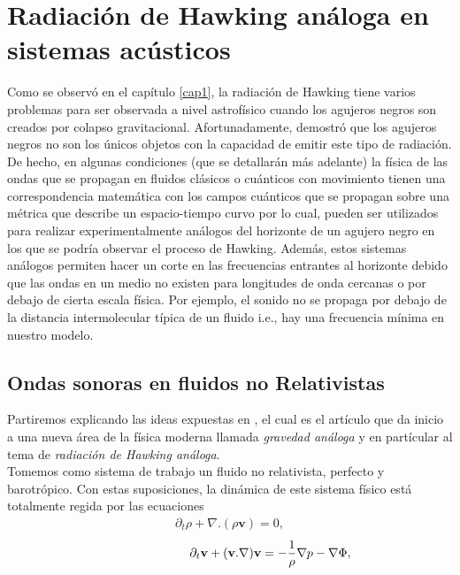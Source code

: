 \chapter{Radiaci\'{o}n de Hawking an\'{a}loga en sistemas ac\'{u}sticos}\label{cap2}
Como se observ\'{o} en el cap\'{i}tulo \ref{cap1}, la radiaci\'{o}n de Hawking tiene varios problemas para ser observada a nivel astrof\'{i}sico cuando los agujeros negros son creados por colapso gravitacional. Afortunadamente, \cite{Unruh1981} demostró que los agujeros negros no son los únicos objetos con la capacidad de emitir este tipo de radiaci\'{o}n. De hecho, en algunas condiciones (que se detallar\'{a}n más adelante) la física de las ondas que se propagan en fluidos cl\'{a}sicos o cu\'{a}nticos con movimiento tienen una correspondencia matemática con los campos cu\'{a}nticos que se propagan sobre una m\'{e}trica que describe un espacio-tiempo curvo por lo cual, pueden ser utilizados para realizar experimentalmente análogos del horizonte de un agujero negro en los que se podría observar el proceso de Hawking. Además, estos sistemas an\'{a}logos permiten hacer un corte en las frecuencias entrantes al horizonte debido que las ondas en un medio no existen para longitudes de onda cercanas o por debajo de cierta escala física. Por ejemplo, el sonido no se propaga por debajo de la distancia intermolecular típica de un fluido i.e., hay una frecuencia m\'{i}nima en nuestro modelo.

\section{Ondas sonoras en fluidos no Relativistas}
Partiremos explicando las ideas expuestas en  \citep{Unruh1981}, el cual es el art\'{i}culo  que da inicio a una nueva \'{a}rea de la f\'{i}sica moderna llamada \textit{gravedad an\'{a}loga} \citep{barcelo2011analogue} y en part\'{i}cular al tema de \textit{radiaci\'{o}n de Hawking  an\'{a}loga}.\\

Tomemos como sistema de trabajo un fluido no relativista, perfecto y barotr\'{o}pico. Con estas suposiciones, la din\'{a}mica de este sistema f\'{i}sico est\'{a} totalmente regida por las ecuaciones
\begin{align}\label{ec:fluid}
\partial_t \rho +\nabla .(\rho \textbf{v})=0,
\end{align}
\begin{align}\label{ec:fluido2}
\hspace{2.3cm} \partial_t\textbf{v}+(\textbf{v}.\nabla)\textbf{v}=-\frac{1}{\rho}\nabla p-\nabla \Phi,
\end{align}

